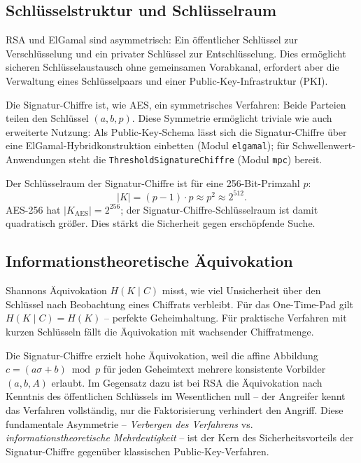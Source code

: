 ﻿\documentclass[a4paper,12pt]{scrreprt}
\theoremstyle{definition}
\begin{document}
\subsection{Schlüsselstruktur und Schlüsselraum}

RSA und ElGamal sind asymmetrisch: Ein öffentlicher Schlüssel zur Verschlüsselung und ein privater Schlüssel zur Entschlüsselung. Dies ermöglicht sicheren Schlüsselaustausch ohne gemeinsamen Vorabkanal, erfordert aber die Verwaltung eines Schlüsselpaars und einer Public-Key-Infrastruktur (PKI).

Die Signatur-Chiffre ist, wie AES, ein symmetrisches Verfahren: Beide Parteien teilen den Schlüssel $(a, b, p)$. Diese Symmetrie ermöglicht triviale wie auch erweiterte Nutzung: Als Public-Key-Schema lässt sich die Signatur-Chiffre über eine ElGamal-Hybridkonstruktion einbetten (Modul \texttt{elgamal}); für Schwellenwert-Anwendungen steht die \texttt{Threshold\-Signature\-Chiffre} (Modul \texttt{mpc}) bereit.

Der Schlüsselraum der Signatur-Chiffre ist für eine 256-Bit-Primzahl $p$:
\[
|K| = (p-1)\cdot p \approx p^2 \approx 2^{512}.
\]
AES-256 hat $|K_{\mathrm{AES}}| = 2^{256}$; der Signatur-Chiffre-Schlüsselraum ist damit quadratisch größer. Dies stärkt die Sicherheit gegen erschöpfende Suche.

\subsection{Informationstheoretische Äquivokation}

Shannons Äquivokation $H(K \mid C)$ misst, wie viel Unsicherheit über den Schlüssel nach Beobachtung eines Chiffrats verbleibt. Für das One-Time-Pad gilt $H(K \mid C) = H(K)$ -- perfekte Geheimhaltung. Für praktische Verfahren mit kurzen Schlüsseln fällt die Äquivokation mit wachsender Chiffratmenge.

Die Signatur-Chiffre erzielt hohe Äquivokation, weil die affine Abbildung $c = (a\sigma + b) \bmod p$ für jeden Geheimtext mehrere konsistente Vorbilder $(a,b,A)$ erlaubt. Im Gegensatz dazu ist bei RSA die Äquivokation nach Kenntnis des öffentlichen Schlüssels im Wesentlichen null -- der Angreifer kennt das Verfahren vollständig, nur die Faktorisierung verhindert den Angriff. Diese fundamentale Asymmetrie -- \emph{Verbergen des Verfahrens} vs. \emph{informationstheoretische Mehrdeutigkeit} -- ist der Kern des Sicherheitsvorteils der Signatur-Chiffre gegenüber klassischen Public-Key-Verfahren.
\end{document}
